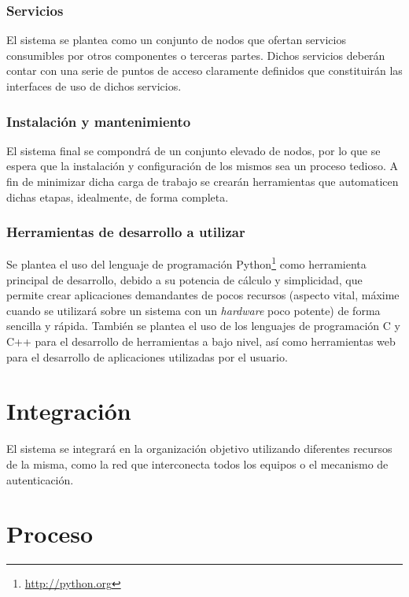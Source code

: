 \subsubsection{Servicios}

El sistema se plantea como un conjunto de nodos que ofertan servicios consumibles por otros componentes o terceras partes. Dichos servicios deberán contar con una serie de puntos de acceso claramente definidos que constituirán las interfaces de uso de dichos servicios.

\subsubsection{Instalación y mantenimiento}

El sistema final se compondrá de un conjunto elevado de nodos, por lo que se espera que la instalación y configuración de los mismos sea un proceso tedioso. A fin de minimizar dicha carga de trabajo se crearán herramientas que automaticen dichas etapas, idealmente, de forma completa.

\subsubsection{Herramientas de desarrollo a utilizar}

Se plantea el uso del lenguaje de programación Python\footnote{\href{http://www.python.org}{http://python.org}} como herramienta principal de desarrollo, debido a su potencia de cálculo y simplicidad, que permite crear aplicaciones demandantes de pocos recursos (aspecto vital, máxime cuando se utilizará sobre un sistema con un \textit{hardware} poco potente) de forma sencilla y rápida. También se plantea el uso de los lenguajes de programación C y C++ para el desarrollo de herramientas a bajo nivel, así como herramientas web para el desarrollo de aplicaciones utilizadas por el usuario.

\section{Integración}

El sistema se integrará en la organización objetivo utilizando diferentes recursos de la misma, como la red que interconecta todos los equipos o el mecanismo de autenticación.

\section{Proceso}

